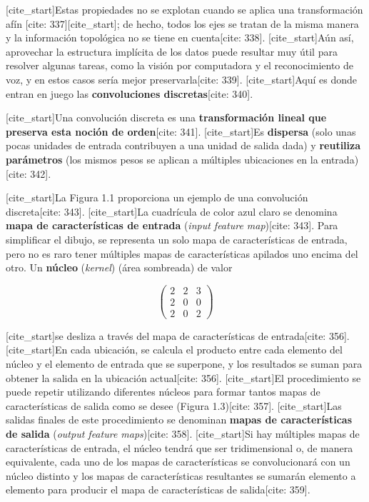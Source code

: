 \documentclass[
  super,
  preprint,
  3p]{elsarticle}
\begin{document}
{[}cite\_start{]}Estas propiedades no se explotan cuando se aplica una
transformación afín {[}cite: 337{]}{[}cite\_start{]}; de hecho, todos
los ejes se tratan de la misma manera y la información topológica no se
tiene en cuenta{[}cite: 338{]}. {[}cite\_start{]}Aún así, aprovechar la
estructura implícita de los datos puede resultar muy útil para resolver
algunas tareas, como la visión por computadora y el reconocimiento de
voz, y en estos casos sería mejor preservarla{[}cite: 339{]}.
{[}cite\_start{]}Aquí es donde entran en juego las \textbf{convoluciones
discretas}{[}cite: 340{]}.

{[}cite\_start{]}Una convolución discreta es una \textbf{transformación
lineal que preserva esta noción de orden}{[}cite: 341{]}.
{[}cite\_start{]}Es \textbf{dispersa} (solo unas pocas unidades de
entrada contribuyen a una unidad de salida dada) y \textbf{reutiliza
parámetros} (los mismos pesos se aplican a múltiples ubicaciones en la
entrada){[}cite: 342{]}.

{[}cite\_start{]}La Figura 1.1 proporciona un ejemplo de una convolución
discreta{[}cite: 343{]}. {[}cite\_start{]}La cuadrícula de color azul
claro se denomina \textbf{mapa de características de entrada}
(\emph{input feature map}){[}cite: 343{]}. Para simplificar el dibujo,
se representa un solo mapa de características de entrada, pero no es
raro tener múltiples mapas de características apilados uno encima del
otro. Un \textbf{núcleo} (\emph{kernel}) (área sombreada) de valor

\[
\begin{pmatrix}
2 & 2 & 3 \\
2 & 0 & 0 \\
2 & 0 & 2
\end{pmatrix}
\]

{[}cite\_start{]}se desliza a través del mapa de características de
entrada{[}cite: 356{]}. {[}cite\_start{]}En cada ubicación, se calcula
el producto entre cada elemento del núcleo y el elemento de entrada que
se superpone, y los resultados se suman para obtener la salida en la
ubicación actual{[}cite: 356{]}. {[}cite\_start{]}El procedimiento se
puede repetir utilizando diferentes núcleos para formar tantos mapas de
características de salida como se desee (Figura 1.3){[}cite: 357{]}.
{[}cite\_start{]}Las salidas finales de este procedimiento se denominan
\textbf{mapas de características de salida} (\emph{output feature
maps}){[}cite: 358{]}. {[}cite\_start{]}Si hay múltiples mapas de
características de entrada, el núcleo tendrá que ser tridimensional o,
de manera equivalente, cada uno de los mapas de características se
convolucionará con un núcleo distinto y los mapas de características
resultantes se sumarán elemento a elemento para producir el mapa de
características de salida{[}cite: 359{]}.
\end{document}

